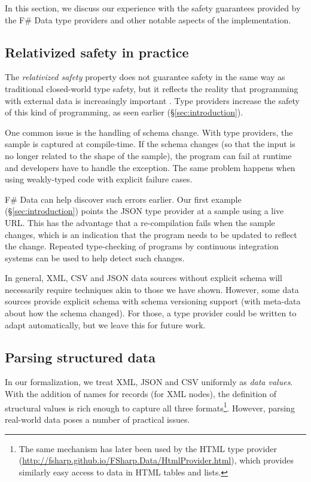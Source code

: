 \documentclass[10pt,preprint,clearpagebib]{sigplanconf}
\begin{document}
In this section, we discuss our experience with the safety guarantees provided by the
F\# Data type providers and other notable aspects of the implementation.

\subsection{Relativized safety in practice}
\label{sec:safety-discuss}

The \emph{relativized safety} property does not guarantee safety in the same way as traditional
closed-world type safety, but it reflects the reality that programming with external data is
increasingly important \cite{age-of-web}. Type providers increase the safety of this kind of programming,
as seen earlier (\S\ref{sec:introduction}).

One common issue is the handling of schema change. With type providers, the sample is captured 
at compile-time. If the schema changes (so that the input is no longer related to the  
shape of the sample), the program can fail at runtime and developers have to handle the exception. 
The same problem happens when using weakly-typed code with explicit failure cases.

F\# Data can help discover such errors earlier. Our first example (\S\ref{sec:introduction})
points the JSON type provider at a sample using a live URL. This has the advantage that a re-compilation 
fails when the sample changes, which is an indication that the program needs to be updated to reflect the
change. Repeated type-checking of programs by continuous integration systems can be used to help 
detect such changes.

In general, XML, CSV and JSON data sources without explicit schema will necessarily require techniques akin
to those we have shown. However, some data sources provide explicit schema with schema versioning support 
(with meta-data about how the schema changed). For those, a type 
provider could be written to adapt automatically, but we leave this for future work.


\subsection{Parsing structured data}
\label{sec:impl-parsing}

In our formalization, we treat XML, JSON and CSV uniformly as \emph{data values}. With the addition of 
names for records (for XML nodes), the definition of structural values is rich enough to capture all 
three formats\footnote{The same mechanism has later been used by the HTML type provider 
(\url{http://fsharp.github.io/FSharp.Data/HtmlProvider.html}), which provides similarly easy 
access to data in HTML tables and lists.}. However, parsing real-world data poses a number of practical issues.
\end{document}
